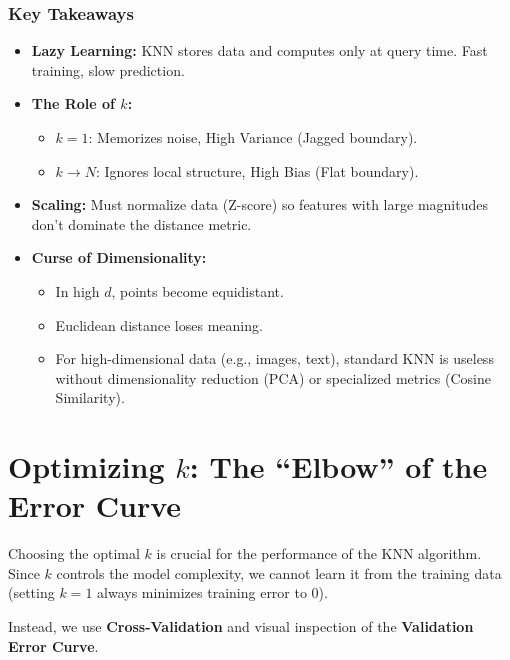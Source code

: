 \documentclass[
  italian,
  11pt,
]{article}
\begin{document}
\subsubsection{Key Takeaways}\label{key-takeaways-19}

\begin{itemize}
\item
  \textbf{Lazy Learning:} KNN stores data and computes only at query
  time. Fast training, slow prediction.
\item
  \textbf{The Role of \(k\):}

  \begin{itemize}
  \item
    \(k=1\): Memorizes noise, High Variance (Jagged boundary).
  \item
    \(k \to N\): Ignores local structure, High Bias (Flat boundary).
  \end{itemize}
\item
  \textbf{Scaling:} Must normalize data (Z-score) so features with large
  magnitudes don't dominate the distance metric.
\item
  \textbf{Curse of Dimensionality:}

  \begin{itemize}
  \item
    In high \(d\), points become equidistant.
  \item
    Euclidean distance loses meaning.
  \item
    For high-dimensional data (e.g., images, text), standard KNN is
    useless without dimensionality reduction (PCA) or specialized
    metrics (Cosine Similarity).

    \newpage
  \end{itemize}
\end{itemize}

\section{\texorpdfstring{Optimizing \(k\): The ``Elbow'' of the Error
Curve}{Optimizing k: The ``Elbow'' of the Error Curve}}\label{optimizing-k-the-elbow-of-the-error-curve}

Choosing the optimal \(k\) is crucial for the performance of the KNN
algorithm. Since \(k\) controls the model complexity, we cannot learn it
from the training data (setting \(k=1\) always minimizes training error
to 0).

Instead, we use \textbf{Cross-Validation} and visual inspection of the
\textbf{Validation Error Curve}.
\end{document}
